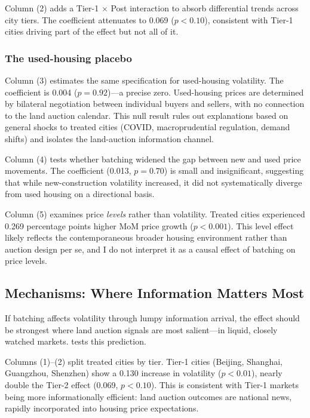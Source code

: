 \documentclass[12pt]{article}
\begin{document}
Column (2) adds a Tier-1 $\times$ Post interaction to absorb differential trends across city tiers. The coefficient attenuates to 0.069 ($p < 0.10$), consistent with Tier-1 cities driving part of the effect but not all of it.

\subsubsection*{The used-housing placebo} Column (3) estimates the same specification for used-housing volatility. The coefficient is 0.004 ($p = 0.92$)---a precise zero. Used-housing prices are determined by bilateral negotiation between individual buyers and sellers, with no connection to the land auction calendar. This null result rules out explanations based on general shocks to treated cities (COVID, macroprudential regulation, demand shifts) and isolates the land-auction information channel.

Column (4) tests whether batching widened the gap between new and used price movements. The coefficient (0.013, $p = 0.70$) is small and insignificant, suggesting that while new-construction volatility increased, it did not systematically diverge from used housing on a directional basis.

Column (5) examines price \textit{levels} rather than volatility. Treated cities experienced 0.269 percentage points higher MoM price growth ($p < 0.001$). This level effect likely reflects the contemporaneous broader housing environment rather than auction design per se, and I do not interpret it as a causal effect of batching on price levels.



\subsection{Mechanisms: Where Information Matters Most}

If batching affects volatility through lumpy information arrival, the effect should be strongest where land auction signals are most salient---in liquid, closely watched markets.  tests this prediction.

Columns (1)--(2) split treated cities by tier. Tier-1 cities (Beijing, Shanghai, Guangzhou, Shenzhen) show a 0.130 increase in volatility ($p < 0.01$), nearly double the Tier-2 effect (0.069, $p < 0.10$). This is consistent with Tier-1 markets being more informationally efficient: land auction outcomes are national news, rapidly incorporated into housing price expectations.
\end{document}
